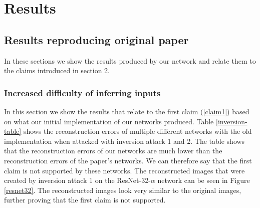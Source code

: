 \section{Results}
\label{sec:results}

\subsection{Results reproducing original paper}
In these sections we show the results produced by our network and relate them to the claims introduced in section 2.

\subsubsection{Increased difficulty of inferring inputs}
In this section we show the results that relate to the first claim (\ref{claim1}) based on what our initial implementation of our networks produced.
Table \ref{inversion-table} shows the reconstruction errors of multiple different networks with the old implementation when attacked with inversion attack 1 and 2. The table shows that the reconstruction errors of our networks are much lower than the reconstruction errors of the paper's networks. We can therefore say that the first claim is not supported by these networks.
The reconstructed images that were created by inversion attack 1 on the ResNet-32-$\alpha$ network can be seen in Figure \ref{resnet32}. The reconstructed images look very similar to the original images, further proving that the first claim is not supported.

